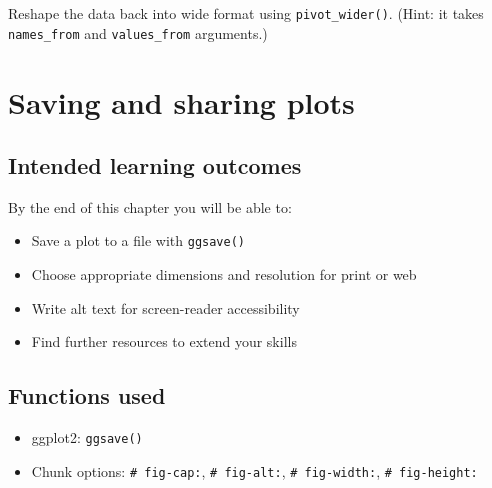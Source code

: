 \documentclass[
  english,
  letterpaper,
]{book}
\providecommand{\tightlist}{%
  \setlength{\itemsep}{0pt}\setlength{\parskip}{0pt}}
\begin{document}
\begin{tcolorbox}[enhanced jigsaw, colframe=quarto-callout-tip-color-frame, breakable, left=2mm, leftrule=.75mm, toptitle=1mm, rightrule=.15mm, opacitybacktitle=0.6, arc=.35mm, colback=white, title=\textcolor{quarto-callout-tip-color}{\faLightbulb}\hspace{0.5em}{Activity 2}, coltitle=black, colbacktitle=quarto-callout-tip-color!10!white, toprule=.15mm, bottomtitle=1mm, opacityback=0, titlerule=0mm, bottomrule=.15mm]

Reshape the data back into wide format using \texttt{pivot\_wider()}.
(Hint: it takes \texttt{names\_from} and \texttt{values\_from}
arguments.)

\end{tcolorbox}


\chapter{Saving and sharing plots}\label{sec-saving}

\section{Intended learning outcomes}\label{intended-learning-outcomes-6}

By the end of this chapter you will be able to:

\begin{itemize}
\tightlist
\item
  Save a plot to a file with \texttt{ggsave()}
\item
  Choose appropriate dimensions and resolution for print or web
\item
  Write alt text for screen-reader accessibility
\item
  Find further resources to extend your skills
\end{itemize}

\section{Functions used}\label{functions-used-5}

\begin{itemize}
\tightlist
\item
  ggplot2: \texttt{ggsave()}
\item
  Chunk options: \texttt{\#\textbar{}\ fig-cap:},
  \texttt{\#\textbar{}\ fig-alt:}, \texttt{\#\textbar{}\ fig-width:},
  \texttt{\#\textbar{}\ fig-height:}
\end{itemize}
\end{document}
